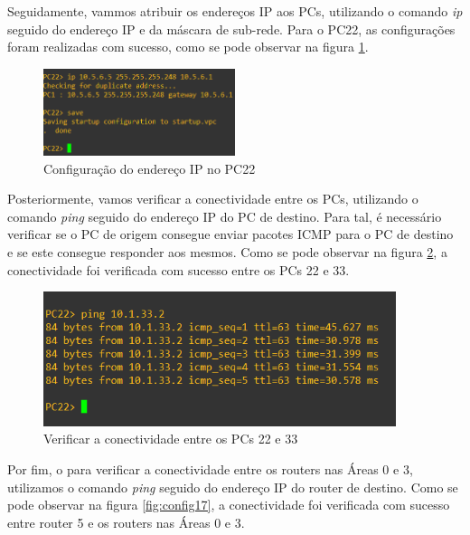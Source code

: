 \documentclass[11pt,english, openright, oneside]{book}
\begin{document}
Seguidamente, vammos atribuir os endereços IP aos PCs, utilizando o comando \textit{ip} seguido do endereço IP e da máscara de sub-rede. Para o PC22, as configurações foram realizadas com sucesso, como se pode observar na figura \ref{fig:config15}.
\vspace{0.2cm}

\begin{figure}[H]
    \centering
    \includegraphics[width=0.5\textwidth]{imagens/Tarefa2/11.pc22_conf.png}
    \caption{Configuração do endereço IP no PC22}
    \label{fig:config15}
\end{figure}
\vspace{0.2cm}

Posteriormente, vamos verificar a conectividade entre os PCs, utilizando o comando \textit{ping} seguido do endereço IP do PC de destino. Para tal, é necessário verificar se o PC de origem consegue enviar pacotes ICMP para o PC de destino e se este consegue responder aos mesmos. Como se pode observar na figura \ref{fig:config16}, a conectividade foi verificada com sucesso entre os PCs 22 e 33.

\begin{figure}[H]
    \centering
    \includegraphics[width=0.92\textwidth]{imagens/Tarefa2/11.ping_pc22_pc33.png}
    \caption{Verificar a conectividade entre os PCs 22 e 33}
    \label{fig:config16}
\end{figure}
\vspace{0.2cm}

Por fim, o para verificar a conectividade entre os routers nas Áreas 0 e 3, utilizamos o comando \textit{ping} seguido do endereço IP do router de destino. Como se pode observar na figura \ref{fig:config17}, a conectividade foi verificada com sucesso entre router 5 e os routers nas Áreas 0 e 3.
\end{document}

